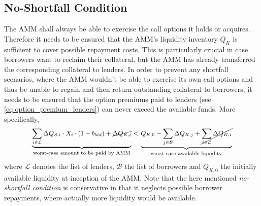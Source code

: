 \documentclass[a4paper]{article}
\begin{document}
\subsection{No-Shortfall Condition}
The AMM shall always be able to exercise the call options it holds or acquires. Therefore it needs to be ensured that the AMM's liquidity inventory $Q_K$ is sufficient to cover possible repayment costs. This is particularly crucial in case borrowers want to reclaim their collateral, but the AMM has already transferred the corresponding collateral to lenders. In order to prevent any shortfall scenarios, where the AMM wouldn't be able to exercise its own call options and thus be unable to regain and then return outstanding collateral to borrowers, it needs to be ensured that the option premiums paid to lenders (see \cref{eq:option_premium_lenders}) can never exceed the available funds. More specifically,
\begin{equation}
\begin{split}
\small
\underbrace{ \sum_{i \in \mathcal{L}} \Delta Q_{S,i} \cdot X_i \cdot (1-b_{bid})  + \cancel{\Delta Q_{K,i}} }_{\textrm{worst-case amount to be paid by AMM}} < \underbrace{ Q_{K,0} - \sum_{j \in \mathcal{B}} \Delta Q_{K,j} + \cancel{\sum_{i \in \mathcal{L}} \Delta Q_{K,i}} }_{\textrm{worst-case available liquidity}}
\end{split}
\end{equation}
where $\mathcal{L}$ denotes the list of lenders, $\mathcal{B}$ the list of borrowers and $Q_{K, 0}$ the initially available liquidity at inception of the AMM. Note that the here mentioned \emph{no-shortfall condition} is conservative in that it neglects possible borrower repayments, where actually more liquidity would be available.




\end{document}

